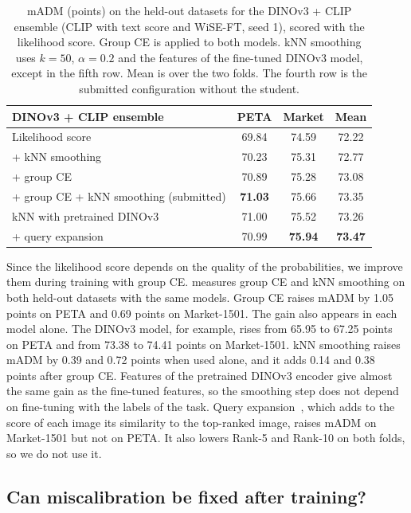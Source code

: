 \documentclass[10pt,twocolumn,letterpaper]{article}
\begin{document}
\begin{table}[t]
\centering
\small
\setlength{\tabcolsep}{2.4pt}
\begin{tabular}{@{}lccc@{}}
\toprule
DINOv3 + CLIP ensemble & PETA & Market & Mean \\
\midrule
Likelihood score & 69.84 & 74.59 & 72.22 \\
+ kNN smoothing & 70.23 & 75.31 & 72.77 \\
+ group CE & 70.89 & 75.28 & 73.08 \\
+ group CE + kNN smoothing (submitted) & \textbf{71.03} & 75.66 & 73.35 \\
\midrule
\quad kNN with pretrained DINOv3 & 71.00 & 75.52 & 73.26 \\
\quad + query expansion & 70.99 & \textbf{75.94} & \textbf{73.47} \\
\bottomrule
\end{tabular}
\caption{mADM (points) on the held-out datasets for the DINOv3 + CLIP ensemble (CLIP with text score and WiSE-FT, seed 1), scored with the likelihood score. Group CE is applied to both models. kNN smoothing uses $k=50$, $\alpha=0.2$ and the features of the fine-tuned DINOv3 model, except in the fifth row. Mean is over the two folds. The fourth row is the submitted configuration without the student.}
\label{tab:gce}
\end{table}

Since the likelihood score depends on the quality of the probabilities, we improve them during training with group CE.  measures group CE and kNN smoothing on both held-out datasets with the same models. Group CE raises mADM by 1.05 points on PETA and 0.69 points on Market-1501. The gain also appears in each model alone. The DINOv3 model, for example, rises from 65.95 to 67.25 points on PETA and from 73.38 to 74.41 points on Market-1501. kNN smoothing raises mADM by 0.39 and 0.72 points when used alone, and it adds 0.14 and 0.38 points after group CE. Features of the pretrained DINOv3 encoder give almost the same gain as the fine-tuned features, so the smoothing step does not depend on fine-tuning with the labels of the task. Query expansion~\cite{chum07}, which adds to the score of each image its similarity to the top-ranked image, raises mADM on Market-1501 but not on PETA. It also lowers Rank-5 and Rank-10 on both folds, so we do not use it.

\subsection{Can miscalibration be fixed after training?}
\label{sec:calib}
\end{document}
